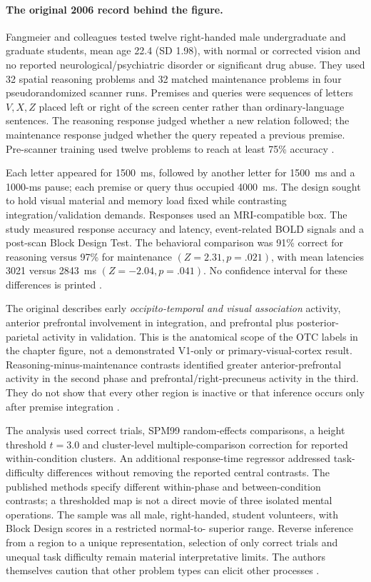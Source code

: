 \paragraph{The original 2006 record behind the figure.}
Fangmeier and colleagues tested twelve right-handed male undergraduate and
graduate students, mean age 22.4 (SD 1.98), with normal or corrected vision
and no reported neurological/psychiatric disorder or significant drug abuse.
They used 32 spatial reasoning problems and 32 matched maintenance problems
in four pseudorandomized scanner runs. Premises and queries were sequences
of letters \(V,X,Z\) placed left or right of the screen center rather than
ordinary-language sentences. The reasoning response judged whether a new
relation followed; the maintenance response judged whether the query
repeated a previous premise. Pre-scanner training used twelve problems to
reach at least 75\% accuracy
\parencite[pp.~321,330--332]{FangmeierEtAl2006ThreeStage}.

Each letter appeared for 1500~ms, followed by another letter for 1500~ms
and a 1000-ms pause; each premise or query thus occupied 4000~ms.
The design sought to hold visual material and memory load fixed while
contrasting integration/validation demands. Responses used an MRI-compatible
box. The study measured response accuracy and latency, event-related BOLD
signals and a post-scan Block Design Test. The behavioral comparison was
91\% correct for reasoning versus 97\% for maintenance
\((Z=2.31,p=.021)\), with mean latencies 3021 versus 2843~ms
\((Z=-2.04,p=.041)\). No confidence interval for these differences is
printed \parencite[pp.~322,330--332]{FangmeierEtAl2006ThreeStage}.

The original describes early \emph{occipito-temporal and visual association}
activity, anterior prefrontal involvement in integration, and prefrontal
plus posterior-parietal activity in validation. This is the anatomical
scope of the OTC labels in the chapter figure, not a demonstrated V1-only
or primary-visual-cortex result. Reasoning-minus-maintenance contrasts
identified greater anterior-prefrontal activity in the second phase and
prefrontal/right-precuneus activity in the third. They do not show that
every other region is inactive or that inference occurs only after premise
integration \parencite[pp.~322--330]{FangmeierEtAl2006ThreeStage}.

The analysis used correct trials, SPM99 random-effects comparisons, a
height threshold \(t=3.0\) and cluster-level multiple-comparison correction
for reported within-condition clusters. An additional response-time regressor
addressed task-difficulty differences without removing the reported central
contrasts. The published methods specify different within-phase and
between-condition contrasts; a thresholded map is not a direct movie of
three isolated mental operations. The sample was all male, right-handed,
student volunteers, with Block Design scores in a restricted normal-to-
superior range. Reverse inference from a region to a unique representation,
selection of only correct trials and unequal task difficulty remain material
interpretative limits. The authors themselves caution that other problem
types can elicit other processes
\parencite[pp.~322--330,332]{FangmeierEtAl2006ThreeStage}.

